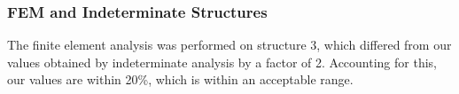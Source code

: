 \subsubsection{FEM and Indeterminate Structures}

The finite element analysis was performed on structure 3, which differed from our values obtained by indeterminate analysis by a factor of 2. 
Accounting for this, our values are within 20\%, which is within an acceptable range.  